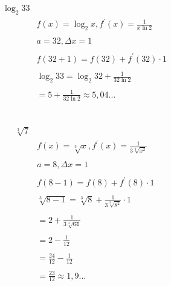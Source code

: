 \documentclass{article}
\theoremstyle{mytheoremstyle}
\theoremstyle{mytheoremstyle}
\theoremstyle{myproblemstyle}
\begin{document}
    \begin{equation*} 
        \begin{split}
         \\\log_{2}33\\
             &f(x)=\log_{2}x, f^\prime(x)=\frac{1}{x \ln2} \\
             \\
             &a=32, \varDelta x=1\\
             \\
             &f(32 + 1)=f(32)+f^\prime(32)\cdot 1\\
             \\
             &\log_{2}33 = \log_{2}32 + \frac{1}{32\ln2}\\
             \\
             &=5+\frac{1}{32\ln2}\approx 5,04...\\
             \\
        \end{split}
    \end{equation*}
    \\
    \begin{equation*} 
        \begin{split}
         \\\sqrt[3]{7}\\
             &f(x)=\sqrt[3]x, f^\prime(x)= \frac{1}{3 \sqrt[3]{x^2}} \\
             \\
             &a=8, \varDelta x=1\\
             \\
             &f(8 -1)=f(8)+f^\prime(8)\cdot 1\\
             \\
             &\sqrt[3]{8-1} = \sqrt[3]{8} + \frac{1}{3\sqrt[3]{8^2}}\cdot 1 \\
             \\
             &= 2 + \frac{1}{3\sqrt[3]{64}}\\
             \\
             &=2-\frac{1}{12}\\
             \\
             &=\frac{24}{12}-\frac{1}{12}\\
             \\
             &=\frac{23}{12}\approx 1,9...\\
        \end{split}
    \end{equation*}
    \\
\end{document}
